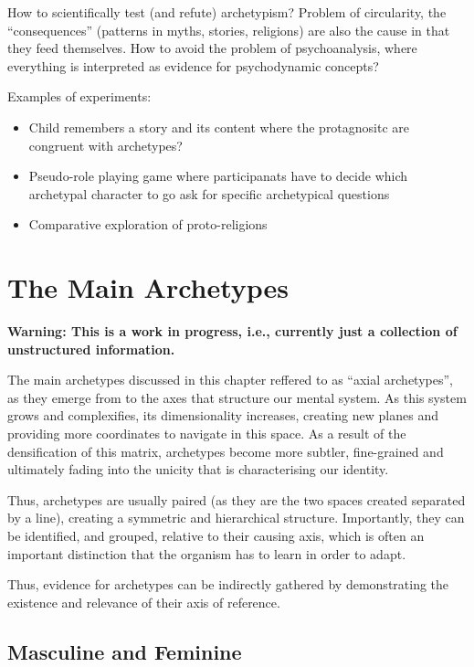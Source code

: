 \documentclass[]{book}
\providecommand{\tightlist}{%
  \setlength{\itemsep}{0pt}\setlength{\parskip}{0pt}}
\begin{document}
How to scientifically test (and refute) archetypism? Problem of circularity, the ``consequences'' (patterns in myths, stories, religions) are also the cause in that they feed themselves. How to avoid the problem of psychoanalysis, where everything is interpreted as evidence for psychodynamic concepts?

Examples of experiments:

\begin{itemize}
\tightlist
\item
  Child remembers a story and its content where the protagnositc are congruent with archetypes?
\item
  Pseudo-role playing game where participanats have to decide which archetypal character to go ask for specific archetypical questions
\item
  Comparative exploration of proto-religions
\end{itemize}

\hypertarget{the-main-archetypes}{%
\chapter{The Main Archetypes}\label{the-main-archetypes}}

\textbf{Warning: This is a work in progress, i.e., currently just a collection of unstructured information.}

The main archetypes discussed in this chapter reffered to as ``axial archetypes'', as they emerge from to the axes that structure our mental system. As this system grows and complexifies, its dimensionality increases, creating new planes and providing more coordinates to navigate in this space. As a result of the densification of this matrix, archetypes become more subtler, fine-grained and ultimately fading into the unicity that is characterising our identity.

Thus, archetypes are usually paired (as they are the two spaces created separated by a line), creating a symmetric and hierarchical structure. Importantly, they can be identified, and grouped, relative to their causing axis, which is often an important distinction that the organism has to learn in order to adapt.

Thus, evidence for archetypes can be indirectly gathered by demonstrating the existence and relevance of their axis of reference.

\hypertarget{masculine-and-feminine}{%
\section{Masculine and Feminine}\label{masculine-and-feminine}}
\end{document}
